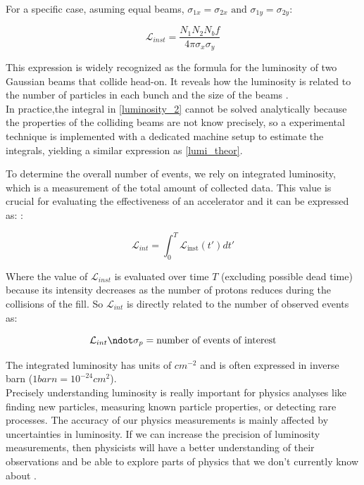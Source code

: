 For a specific case, asuming equal beams, $\sigma_{1x}= \sigma_{2x} \text{ and } \sigma_{1y}= \sigma_{2y}$:

\begin{equation}
  \mathcal{L}_{inst}= \frac{N_{1} N_{2} N_{b}f }{4\pi \sigma_{x} \sigma_{y}}
  \label{lumi_theor}
\end{equation}

This expression is widely recognized as the formula for the luminosity of two Gaussian beams that collide head-on. It reveals how the luminosity is related to the number of particles in each bunch and the size of the beams \cite{concept_of_luminosity}.\\

In practice,the integral in  \ref{luminosity_2} cannot be solved analytically because   the properties of the colliding beams are not know precisely, so a experimental technique is implemented with a dedicated machine setup to estimate the integrals, yielding a similar expression as \ref{lumi_theor}.

To determine the overall number of events, we rely on integrated luminosity, which is a measurement of the total amount of collected data. This value is crucial for evaluating the effectiveness of an accelerator and it can be expressed as: \cite{concept_of_luminosity}:

\begin{equation}
  \mathcal{L}_{int}=\int_{0}^{T} \mathcal {L}_{\text{inst}}(t') dt'
\end{equation}

Where the value of $\mathcal{L}_{inst}$ is evaluated over time $T$ (excluding possible dead time) because its intensity decreases as the number of protons reduces during the collisions of the fill. So $\mathcal{L}_{int}$ is directly related to the number of observed events as:

\begin{equation}
  \mathcal{L}_{int} \ndot \sigma_{p}= \text{number of events of interest}
\end{equation}

The integrated luminosity has units of $cm^{-2}$ and is often expressed in inverse barn ($1 barn= 10^{-24}cm^{2}$). \\

Precisely understanding luminosity is really important for physics analyses like finding new particles, measuring known particle properties, or detecting rare processes. The accuracy of our physics measurements is mainly affected by uncertainties in luminosity. If we can increase the precision of luminosity measurements, then physicists will have a better understanding of their observations and be able to explore parts of physics that we don't currently know about \cite{luminosity_importance}.

